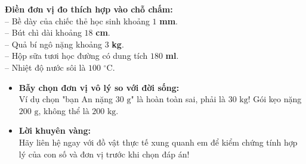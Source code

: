 \documentclass[11pt,a4paper]{article}
\begin{document}
\vspace{-2.5mm}
\noindent
\begin{minipage}[t]{0.49\textwidth}\vspace{0pt}
\begin{tcolorbox}[
  enhanced,
  colback=green!4!white,
  colframe=green!60!black,
  arc=2mm, boxrule=0.8pt,
  left=2mm, right=2mm, top=1.8mm, bottom=1.8mm,
  title={\footnotesize\bfseries\color{white}\faCheckCircle\ Ví dụ thực hành chuẩn mực}
]
{\footnotesize
\textbf{Điền đơn vị đo thích hợp vào chỗ chấm:}\\
-- Bề dày của chiếc thẻ học sinh khoảng $1$\textbf{ mm}.\\
-- Bút chì dài khoảng $18$\textbf{ cm}.\\
-- Quả bí ngô nặng khoảng $3$\textbf{ kg}.\\
-- Hộp sữa tươi học đường có dung tích $180$\textbf{ ml}.\\
-- Nhiệt độ nước sôi là $100$\textbf{ $^\circ\text{C}$}.
}
\end{tcolorbox}
\end{minipage}
\hfill
\begin{minipage}[t]{0.49\textwidth}\vspace{0pt}
\begin{tcolorbox}[
  enhanced,
  colback=red!4!white,
  colframe=red!70!black,
  arc=2mm, boxrule=0.8pt,
  left=2mm, right=2mm, top=1.8mm, bottom=1.8mm,
  title={\footnotesize\bfseries\color{white}\faExclamationTriangle\ Mẹo tránh bẫy trắc nghiệm}
]
{\footnotesize
\begin{itemize}\setlength{\itemsep}{1.5pt}\setlength{\leftskip}{-2.5mm}
  \item \textbf{Bẫy chọn đơn vị vô lý so với đời sống:}\\
  Ví dụ chọn "bạn An nặng $30\text{ g}$" là hoàn toàn sai, phải là $30\text{ kg}$! Gói kẹo nặng $200\text{ g}$, không thể là $200\text{ kg}$.
  \item \textbf{Lời khuyên vàng:}\\
  Hãy liên hệ ngay với đồ vật thực tế xung quanh em để kiểm chứng tính hợp lý của con số và đơn vị trước khi chọn đáp án!
\end{itemize}
}
\end{tcolorbox}
\end{minipage}
\end{document}
